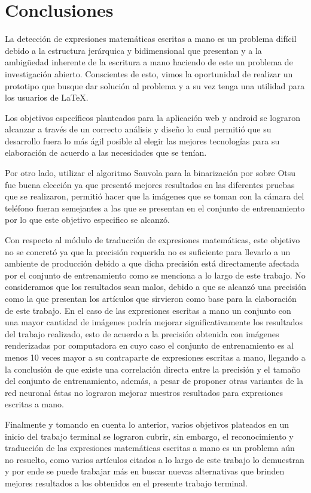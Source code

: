 \chapter{Conclusiones}
La detección de expresiones matemáticas escritas a mano es un problema difícil debido a la estructura jerárquica y bidimensional que presentan y a la ambigüedad inherente de la escritura a mano haciendo de este un problema de investigación abierto. Conscientes de esto, vimos la oportunidad de realizar un prototipo que busque dar solución al problema y a su vez tenga una utilidad para los usuarios de \LaTeX.

Los objetivos específicos planteados para la aplicación web y android se lograron alcanzar a través de un correcto análisis y diseño lo cual permitió que su desarrollo fuera lo más ágil posible al elegir las mejores tecnologías para su elaboración de acuerdo a las necesidades que se tenían.

Por otro lado, utilizar el algoritmo Sauvola para la binarización por sobre Otsu fue buena elección ya que presentó mejores resultados en las diferentes pruebas que se realizaron, permitió hacer que la imágenes que se toman con la cámara del teléfono fueran semejantes a las que se presentan en el conjunto de entrenamiento por lo que este objetivo especifico se alcanzó.

Con respecto al módulo de traducción de expresiones matemáticas, este objetivo no se concretó ya que la precisión requerida no es suficiente para llevarlo a un ambiente de producción debido a que dicha precisión está directamente afectada por el conjunto de entrenamiento como se menciona a lo largo de este trabajo. No consideramos que los resultados sean malos, debido a que se alcanzó una precisión como la que presentan los artículos que sirvieron como base para la elaboración de este trabajo. En el caso de las expresiones escritas a mano un conjunto con una mayor cantidad de imágenes podría mejorar significativamente los resultados del trabajo realizado, esto de acuerdo a la precisión obtenida con imágenes renderizadas por computadora en cuyo caso el conjunto de entrenamiento es al menos 10 veces mayor a su contraparte de expresiones escritas a mano, llegando a la conclusión de que existe una correlación directa entre la precisión y el tamaño del conjunto de entrenamiento, además, a pesar de proponer otras variantes de la red neuronal éstas no lograron mejorar nuestros resultados para expresiones escritas a mano.

Finalmente y tomando en cuenta lo anterior, varios objetivos plateados en un inicio del trabajo terminal se lograron cubrir, sin embargo, el reconocimiento y traducción de las expresiones matemáticas escritas a mano es un problema aún no resuelto, como varios artículos citados a lo largo de este trabajo lo demuestran y por ende se puede trabajar más en buscar nuevas alternativas que brinden mejores resultados a los obtenidos en el presente trabajo terminal.

